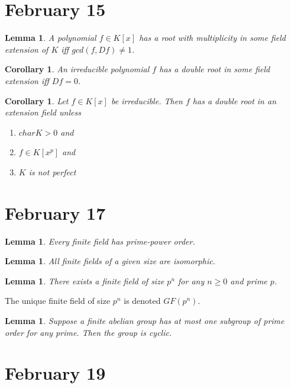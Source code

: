 \documentclass[letterpaper]{article}
\newtheorem{lemma}[theorem]{Lemma}
\newtheorem{corollary}[theorem]{Corollary}
\begin{document}
\section{February 15}

\begin{lemma}
A polynomial $f \in K[x]$ has a root with multiplicity in some field extension of $K$ iff $gcd(f, Df) \ne 1$.
\end{lemma}

\begin{corollary}
An irreducible polynomial $f$ has a double root in some field extension iff $Df = 0$.
\end{corollary}

\begin{corollary}
Let $f \in K[x]$ be irreducible. Then $f$ has a double root in an extension field unless
\begin{enumerate}
\item $char K > 0$ and
\item $f \in K[x^p]$ and
\item $K$ is not perfect
\end{enumerate}
\end{corollary}

\section{February 17}

\begin{lemma}
Every finite field has prime-power order.
\end{lemma}

\begin{lemma}
All finite fields of a given size are isomorphic.
\end{lemma}

\begin{lemma}
There exists a finite field of size $p^n$ for any $n \ge 0$ and prime $p$.
\end{lemma}

The unique finite field of size $p^n$ is denoted $GF(p^n)$.

\begin{lemma}
Suppose a finite abelian group has at most one subgroup of prime order for any prime. Then the group is cyclic.
\end{lemma}

\section{February 19}
\end{document}
